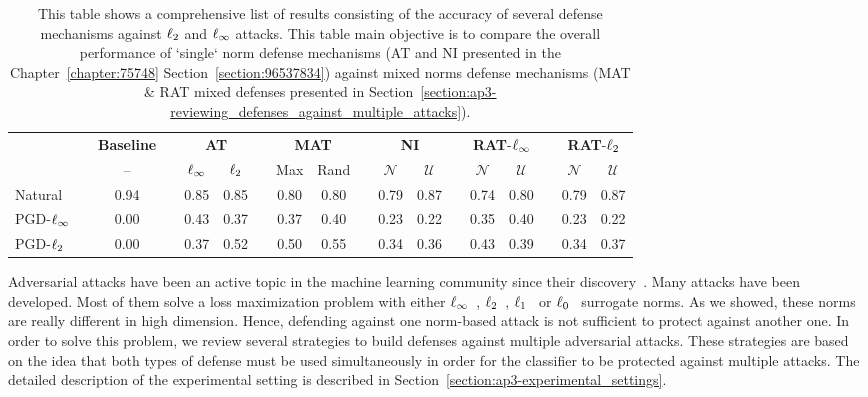 \begin{table}[htbp]
  \centering
  \begin{tabular}{lccccccccccccccccc}
    \toprule
      &   & \textbf{Baseline} & \phantom{...}  & \multicolumn{2}{c}{\textbf{AT}} & \phantom{...}  & \multicolumn{2}{c}{\textbf{MAT}} &  \phantom{...} & \multicolumn{2}{c}{\textbf{NI}} &  \phantom{...} & \multicolumn{2}{c}{\textbf{RAT}-$\ell_\infty $} &  \phantom{...} & \multicolumn{2}{c}{\textbf{RAT}-$\ell_2 $} \\
  \cmidrule{3-3}\cmidrule{5-6}\cmidrule{8-9}\cmidrule{11-12}\cmidrule{14-15}\cmidrule{17-18}      &   & -- &   & $\ell_\infty $ & $\ell_2 $ &   & Max & Rand &   & $\mathcal{N}$ & $\mathcal{U}$ &   & $\mathcal{N}$ & $\mathcal{U}$ &   & $\mathcal{N}$ & $\mathcal{U}$ \\
    \midrule
    Natural &   & 0.94 &   & 0.85 & 0.85 &   & 0.80 & 0.80 &   & 0.79 & 0.87 &   & 0.74 & 0.80 &   & 0.79 & 0.87 \\
    PGD-$\ell_\infty $ &   & 0.00 &   & 0.43 & 0.37 &   & 0.37 & 0.40 &   & 0.23 & 0.22 &   & 0.35 & 0.40 &   & 0.23 & 0.22 \\
    PGD-$\ell_2 $ &   & 0.00 &   & 0.37 & 0.52 &   & 0.50 & 0.55 &   & 0.34 & 0.36 &   & 0.43 & 0.39 &   & 0.34 & 0.37 \\
    \bottomrule
  \end{tabular}%
  \caption{This table shows a comprehensive list of results consisting of the accuracy of several defense mechanisms against $\ell_2 $ and $\ell_\infty $ attacks. This table main objective is to compare the overall performance of ‘single‘ norm defense mechanisms (AT and NI presented in the Chapter~\ref{chapter:75748} Section~\ref{section:96537834}) against mixed norms defense mechanisms (MAT \& RAT mixed defenses presented in Section~\ref{section:ap3-reviewing_defenses_against_multiple_attacks}).}
  \label{table:ap3-results}
\end{table}%

Adversarial attacks have been an active topic in the machine learning community since their discovery~\cite{globerson2006nightmare, biggio2013evasion,szegedy2013intriguing}.
Many attacks have been developed.
Most of them solve a loss maximization problem with either $\ell_\infty $~\cite{goodfellow2014explaining,kurakin2016adversarial,madry2018towards}, $\ell_2 $~\cite{carlini2017towards,kurakin2016adversarial,madry2018towards}, $\ell_1 $~\cite{tramer2019adversarial} or $\ell_0 $~\cite{papernot2016limitations} surrogate norms.
As we showed, these norms are really different in high dimension.
Hence, defending against one norm-based attack is not sufficient to protect against another one. 
In order to solve this problem, we review several strategies to build defenses against multiple adversarial attacks.
These strategies are based on the idea that both types of defense must be used simultaneously in order for the classifier to be protected against multiple attacks.
The detailed description of the experimental setting is described in Section~\ref{section:ap3-experimental_settings}.

